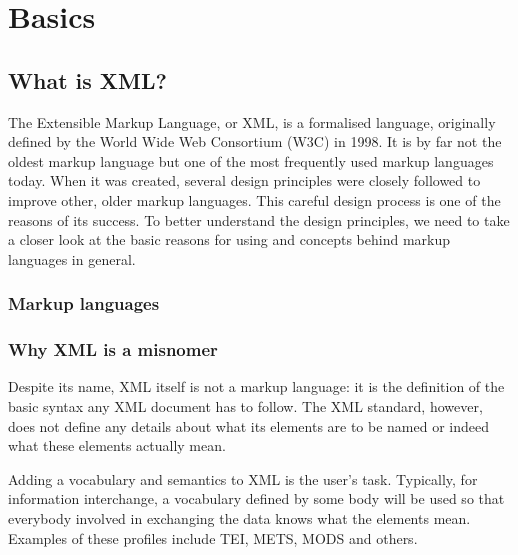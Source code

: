 \chapter{Basics}

\section{What is XML?}
\par The Extensible Markup Language, or XML, is a formalised language, originally
               defined by the World Wide Web Consortium (W3C) in 1998. It is by far not the
               oldest markup language but one of the most frequently used markup languages today. When it was created,
               several design principles were closely followed to improve other, older markup languages. This careful
               design process is one of the reasons of its success. To better understand the design principles, we need
               to take a closer look at the basic reasons for using and concepts behind markup languages in general.

\subsection{Markup languages}

\subsection{Why XML is a misnomer}
\par Despite its name, XML itself is not a markup language: it is the definition of the basic syntax any
                  XML document has to follow. The XML standard, however, does not define any details about what its
                  elements are to be named or indeed what these elements actually mean.
\par Adding a vocabulary and semantics to XML is the user’s task. Typically, for information interchange, a
               vocabulary defined by some body will be used so that everybody involved in exchanging the data knows what
               the elements mean. Examples of these profiles include TEI, METS,
                  MODS and others.

